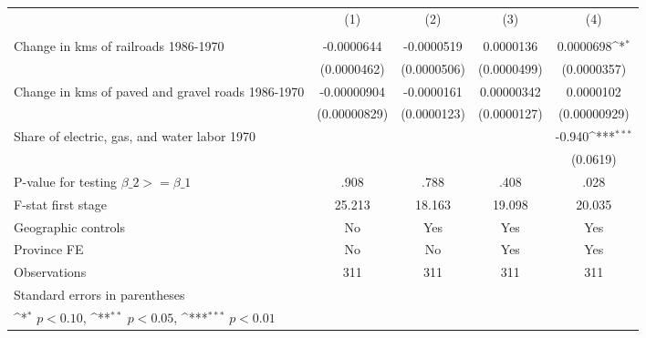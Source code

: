 {
\def\sym#1{\ifmmode^{#1}\else\(^{#1}\)\fi}
\begin{tabular}{l*{4}{c}}
\hline\hline
                &\multicolumn{1}{c}{(1)}&\multicolumn{1}{c}{(2)}&\multicolumn{1}{c}{(3)}&\multicolumn{1}{c}{(4)}\\
                &\multicolumn{1}{c}{}&\multicolumn{1}{c}{}&\multicolumn{1}{c}{}&\multicolumn{1}{c}{}\\
\hline
Change in kms of railroads 1986-1970&-0.0000644         &-0.0000519         &0.0000136         &0.0000698\sym{*}  \\
                &(0.0000462)         &(0.0000506)         &(0.0000499)         &(0.0000357)         \\
[1em]
Change in kms of paved and gravel roads 1986-1970&-0.00000904         &-0.0000161         &0.00000342         &0.0000102         \\
                &(0.00000829)         &(0.0000123)         &(0.0000127)         &(0.00000929)         \\
[1em]
Share of electric, gas, and water labor 1970&                  &                  &                  &   -0.940\sym{***}\\
                &                  &                  &                  & (0.0619)         \\
\hline
P-value for testing $\beta\_{2} >= \beta\_{1}$&     .908         &     .788         &     .408         &     .028         \\
F-stat first stage&   25.213         &   18.163         &   19.098         &   20.035         \\
Geographic controls&       No         &      Yes         &      Yes         &      Yes         \\
Province FE     &       No         &       No         &      Yes         &      Yes         \\
Observations    &      311         &      311         &      311         &      311         \\
\hline\hline
\multicolumn{5}{l}{\footnotesize Standard errors in parentheses}\\
\multicolumn{5}{l}{\footnotesize \sym{*} \(p<0.10\), \sym{**} \(p<0.05\), \sym{***} \(p<0.01\)}\\
\end{tabular}
}
